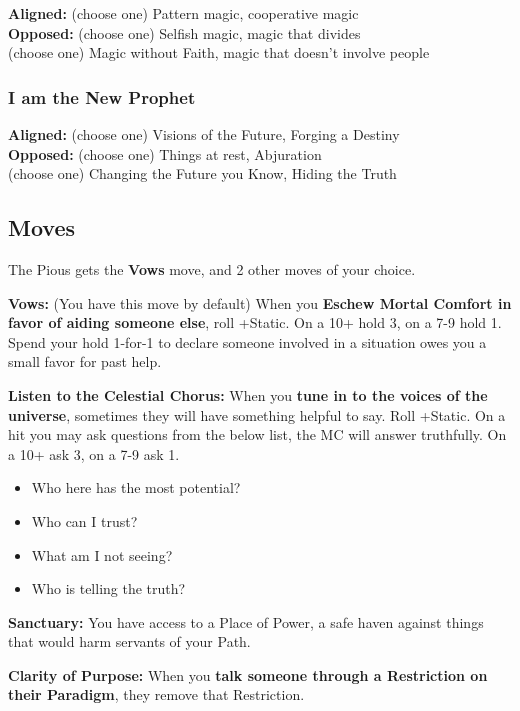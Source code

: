 \documentclass[
  oneside,
  statementpaper,
  9pt]{memoir}
\begin{document}
\textbf{Aligned:} (choose one) Pattern magic, cooperative magic\\
\textbf{Opposed:} (choose one) Selfish magic, magic that divides\\
(choose one) Magic without Faith, magic that doesn't involve people

\hypertarget{i-am-the-new-prophet}{%
\subsubsection{I am the New Prophet}\label{i-am-the-new-prophet}}

\textbf{Aligned:} (choose one) Visions of the Future, Forging a
Destiny\\
\textbf{Opposed:} (choose one) Things at rest, Abjuration\\
(choose one) Changing the Future you Know, Hiding the Truth

\hypertarget{moves-4}{%
\subsection{Moves}\label{moves-4}}

The Pious gets the \textbf{Vows} move, and 2 other moves of your choice.

\textbf{Vows:} (You have this move by default) When you \textbf{Eschew
Mortal Comfort in favor of aiding someone else}, roll +Static. On a 10+
hold 3, on a 7-9 hold 1. Spend your hold 1-for-1 to declare someone
involved in a situation owes you a small favor for past help.

\textbf{Listen to the Celestial Chorus:} When you \textbf{tune in to the
voices of the universe}, sometimes they will have something helpful to
say. Roll +Static. On a hit you may ask questions from the below list,
the MC will answer truthfully. On a 10+ ask 3, on a 7-9 ask 1.

\begin{itemize}
\tightlist
\item
  Who here has the most potential?
\item
  Who can I trust?
\item
  What am I not seeing?
\item
  Who is telling the truth?
\end{itemize}

\textbf{Sanctuary:} You have access to a Place of Power, a safe haven
against things that would harm servants of your Path.

\textbf{Clarity of Purpose:} When you \textbf{talk someone through a
Restriction on their Paradigm}, they remove that Restriction.
\end{document}
